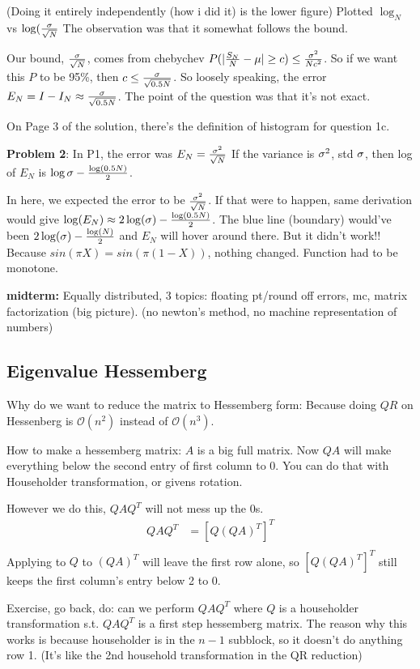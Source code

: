 (Doing it entirely independently (how i did it) is the lower figure)
Plotted $\log_N$ vs $\log(\frac{\sigma}{\sqrt{N}}$
The observation was that it somewhat follows the bound. 

Our bound, $\frac{\sigma}{\sqrt{N}}$, comes from chebychev
$P(|\frac{S_N}{N} - \mu| \ge c) \le \frac{\sigma^2}{Nc^2}$.
So if we want this $P$ to be 95\%, then $c\le
\frac{\sigma}{\sqrt{0.5N}}$. So loosely speaking, the error $E_N = I-I_N
\approx \frac{\sigma}{\sqrt{0.5N}}$. The point of the question was that
it's not exact.

On Page 3 of the solution, there's the definition of histogram for
question 1c.

\textbf{Problem 2}: 
In P1, the error was $E_N = \frac{\sigma^2}{\sqrt{N}}$
If the variance is $\sigma^2$, std $\sigma$, then log of $E_N$ is $\log
\sigma - \frac{\log(0.5N)}{2}$. 

In here, we expected the error to be $\frac{\sigma^2}{\sqrt{N}}$. If
that were to happen, same derivation would give $\log(E_N)\approx
2\log(\sigma) - \frac{\log(0.5N)}{2}$.
The blue line (boundary) would've been $2\log(\sigma) -
\frac{\log(N)}{2}$ and $E_N$ will hover around there. But it didn't
work!! Because $sin(\pi X) = sin(\pi(1-X))$, nothing changed. Function
had to be monotone.

\textbf{midterm:}
Equally distributed, 3 topics: floating pt/round off errors, mc,
matrix factorization (big picture). (no newton's method, no machine
representation of numbers)

\subsection{Eigenvalue Hessemberg}
Why do we want to reduce the matrix to Hessemberg form: Because doing
$QR$ on Hessenberg is $\mathcal{O}(n^2)$ instead of
$\mathcal{O}(n^3)$.

How to make a hessemberg matrix:
$A$ is a big full matrix. Now $QA$ will make everything below the
second entry of first column to 0. You can do that with Householder
transformation, or givens rotation. 

However we do this, $QAQ^T$ will not mess up the 0s.
\begin{align*}
 QAQ^T &= [Q(QA)^T]^T\\
\end{align*}
Applying to $Q$ to $(QA)^T$ will leave the first row alone, so
$[Q(QA)^T]^T$ still keeps the first column's entry below 2 to 0.

Exercise, go back, do: can we perform $QAQ^T$ where $Q$ is a
householder transformation s.t. $QAQ^T$ is a first step hessemberg
matrix. The reason why this works is because householder is in the
$n-1$ subblock, so it doesn't do anything row 1. (It's like the 2nd
household transformation in the QR reduction)


